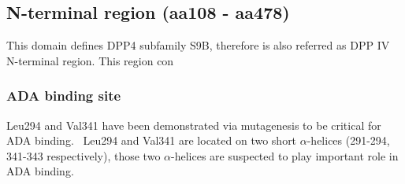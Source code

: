 \subsection{N-terminal region (aa108 - aa478)}

This domain defines DPP4 subfamily S9B, therefore is also referred as DPP IV N-terminal region. This region con

\subsubsection{ADA binding site}
Leu294 and Val341 have been demonstrated via mutagenesis to be critical for ADA binding.~\cite{Abbott_1999} Leu294 and Val341 are located on two short $\alpha$-helices (291-294, 341-343 respectively), those two $\alpha$-helices are suspected to play important role in ADA binding. 
